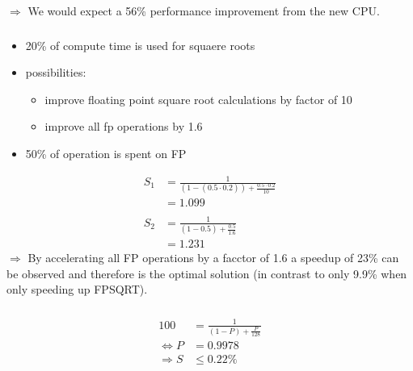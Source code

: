 \documentclass[]{scrartcl}
\begin{document}
$\Rightarrow$ We would expect a 56\% performance improvement from the new CPU\@.

\subsubsection{}
\begin{itemize}
    \item 20\% of compute time is used for squaere roots
    \item possibilities:
        \begin{itemize}
            \item improve floating point square root calculations by factor of 10
            \item improve all fp operations by 1.6
        \end{itemize}
    \item 50\% of operation is spent on FP
\end{itemize}
\begin{align}
    S_1 &= \frac{1}{(1-(0.5\cdot 0.2))+\frac{0.5\cdot0.2}{10}}\\
        &= 1.099\\\nonumber\\
    S_2 &= \frac{1}{(1-0.5)+\frac{0.5}{1.6}}\\
        &= 1.231
\end{align}
$\Rightarrow$ By accelerating all FP operations by a facctor of 1.6 a speedup of 23\% can be observed and therefore is the optimal solution (in contrast to only 9.9\% when only speeding up FPSQRT).

\subsubsection{}
\begin{align}
    100 &= \frac{1}{(1-P)+\frac{P}{128}}\\
    \Leftrightarrow P&= 0.9978\\
    \Rightarrow S &\leq 0.22\%
\end{align}
\end{document}
